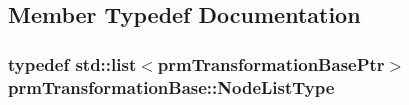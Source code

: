 \subsection{Member Typedef Documentation}
\hypertarget{classprm_transformation_base_a577eae3ee032e09a9ebb774081828d5c}{
\subsubsection[{Node\-List\-Type}]{\setlength{\rightskip}{0pt plus 5cm}typedef std\-::list$<${\bf prm\-Transformation\-Base\-Ptr}$>$ {\bf prm\-Transformation\-Base\-::\-Node\-List\-Type}}}\label{classprm_transformation_base_a577eae3ee032e09a9ebb774081828d5c}


